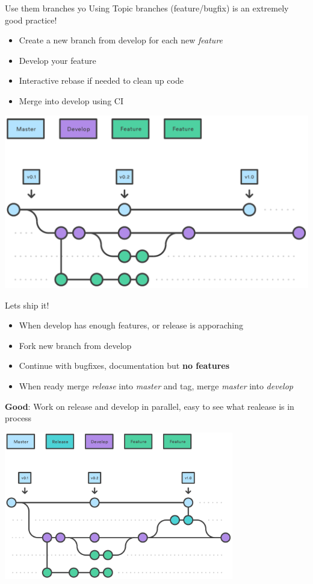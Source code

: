 \documentclass[10pt]{beamer}
\begin{document}
\begin{frame}[fragile]{Use them branches yo}
  Using Topic branches (feature/bugfix) is an extremely good practice!
  \begin{itemize}
    \item Create a new branch from develop for each new \emph{feature}
    \item Develop your feature
    \item Interactive rebase if needed to clean up code
    \item Merge into develop using CI
  \end{itemize}

  \includegraphics[width=\textwidth]{feature}
\end{frame}

\begin{frame}[fragile]{Lets ship it!}

  \begin{itemize}
    \item When develop has enough features, or release is apporaching
    \item Fork new branch from develop
    \item Continue with bugfixes, documentation but \textbf{no features} 
    \item When ready merge \emph{release} into \emph{master} and tag, merge \emph{master} into \emph{develop}
  \end{itemize}

  \textbf{Good}: Work on release and develop in parallel, easy to see what realease is in process

  \includegraphics[width=0.75\textwidth]{release}
\end{frame}
\end{document}
